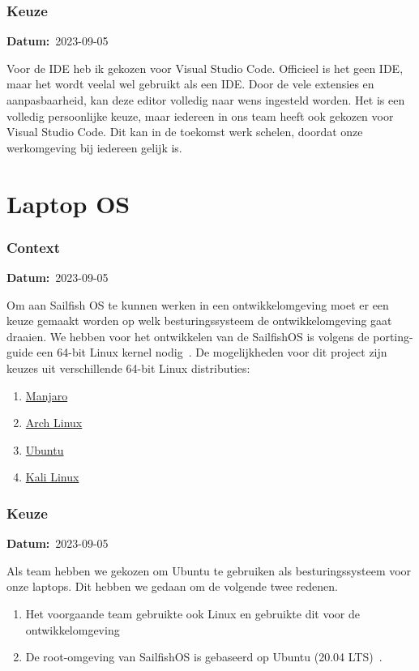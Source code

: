\documentclass[a4paper]{report}
\newcommand{\personalbox}{
  \begin{tcolorbox}[hbox, colback=green!5!white,colframe=green!75!black,
    left=.1mm, right=.1mm, top=.1mm, bottom=.1mm, fontupper=\scriptsize\sffamily]
    Persoonlijke Keuze
  \end{tcolorbox}
}
\newcommand{\personalchoice}[1]{
  \section[ #1 ]{#1~\mbox{\raisebox{-2.5pt}{\personalbox}}}
}
\newcommand{\timestamp}[1]{
  \mbox{\scriptsize \textbf{Datum:} #1} \smallbreak
}
\begin{document}
\subsubsection{Keuze}
\timestamp{2023-09-05}
Voor de IDE heb ik gekozen voor Visual Studio Code. Officieel is het geen IDE, maar het wordt veelal wel gebruikt als een IDE. 
Door de vele extensies en aanpasbaarheid, kan deze editor volledig naar wens ingesteld worden. 
Het is een volledig persoonlijke keuze, maar iedereen in ons team heeft ook gekozen voor Visual Studio Code.
Dit kan in de toekomst werk schelen, doordat onze werkomgeving bij iedereen gelijk is.

\personalchoice{Laptop OS}
\subsubsection{Context}
\timestamp{2023-09-05}
Om aan Sailfish OS te kunnen werken in een ontwikkelomgeving moet er een keuze gemaakt worden op welk besturingssysteem de ontwikkelomgeving gaat draaien. 
We hebben voor het ontwikkelen van de SailfishOS is volgens de porting-guide een 64-bit Linux kernel nodig~\cite{sailfishportingguide}.  
De mogelijkheden voor dit project zijn keuzes uit verschillende 64-bit Linux distributies: 
\begin{enumerate}
  \item \href{https://manjaro.org/}{Manjaro}
  \item \href{https://archlinux.org/}{Arch Linux}
  \item \href{https://ubuntu.com/}{Ubuntu}
  \item \href{https://www.kali.org/}{Kali Linux}
\end{enumerate}


\subsubsection{Keuze}
\timestamp{2023-09-05}
Als team hebben we gekozen om Ubuntu te gebruiken als besturingssysteem voor onze laptops. 
Dit hebben we gedaan om de volgende twee redenen.
\begin{enumerate}
  \item Het voorgaande team gebruikte ook Linux en gebruikte dit voor de ontwikkelomgeving~\cite{fairphonegithub}
  \item De root-omgeving van SailfishOS is gebaseerd op Ubuntu (20.04 LTS)~\cite{sailfishportingguide}.
\end{enumerate}
\end{document}
